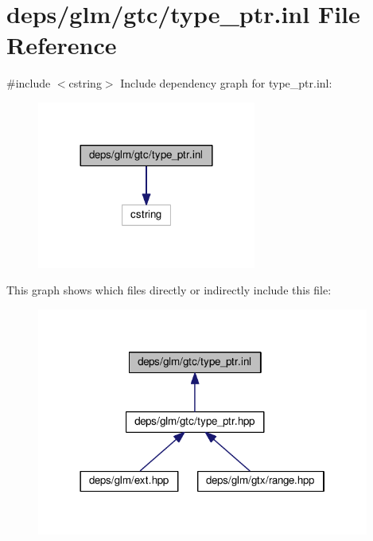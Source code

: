 \hypertarget{type__ptr_8inl}{}\section{deps/glm/gtc/type\+\_\+ptr.inl File Reference}
\label{type__ptr_8inl}
{\ttfamily \#include $<$cstring$>$}\newline
Include dependency graph for type\+\_\+ptr.\+inl\+:
\nopagebreak
\begin{figure}[H]
\begin{center}
\leavevmode
\includegraphics[width=204pt]{d9/dd6/type__ptr_8inl__incl}
\end{center}
\end{figure}
This graph shows which files directly or indirectly include this file\+:
\nopagebreak
\begin{figure}[H]
\begin{center}
\leavevmode
\includegraphics[width=310pt]{dd/d17/type__ptr_8inl__dep__incl}
\end{center}
\end{figure}
